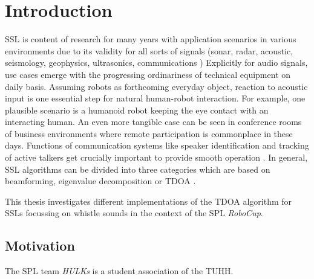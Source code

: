 \chapter{Introduction}
\label{chap:01_introduction}



\acf{SSL} is content of research for many years with
application scenarios in various environments due to its
validity for all sorts of signals (sonar, radar, acoustic, seismology,
geophysics, ultrasonics, communications \cite{Chen2006}) 
Explicitly for audio signals, use cases emerge with the progressing
ordinariness of technical equipment on daily basis.
Assuming robots as forthcoming everyday object, reaction to acoustic
input is one essential step for natural human-robot interaction.
For example, one plausible scenario is a humanoid robot keeping the eye
contact with an interacting human.
An even more tangible case can be seen in conference rooms of business environments
where remote participation is commonplace in these days.
Functions of communication systems like speaker identification and tracking of active talkers
get crucially important to provide smooth operation \cite{Brandstein96apractical}.
In general, \ac{SSL} algorithms can be divided into three categories
which are based on beamforming, eigenvalue decomposition or \ac{TDOA} \cite{Brandstein96apractical}.

This thesis investigates different implementations of the \ac{TDOA} algorithm for \acp{SSL}
focussing on whistle sounds in the context of the \ac{SPL} \textit{RoboCup}.






\section{Motivation}

The \ac{SPL} team \textit{HULKs} is a student association of the \ac{TUHH}.
